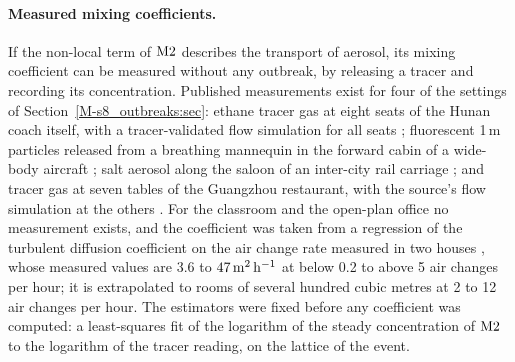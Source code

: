 \paragraph{Measured mixing coefficients.}
If the non-local term of $\mathrm{M2}$ describes the transport of aerosol, its mixing coefficient can be measured
without any outbreak, by releasing a tracer and recording its concentration. Published measurements exist for
four of the settings of Section~\ref{M-s8_outbreaks:sec}: ethane tracer gas at eight seats of the Hunan coach
itself, with a tracer-validated flow simulation for all seats \citep{ou2022}; fluorescent 1\,\textmu m particles
released from a breathing mannequin in the forward cabin of a wide-body aircraft \citep{kinahan2021aerosol};
salt aerosol along the saloon of an inter-city rail carriage \citep{woodward2022evaluation}; and tracer gas at
seven tables of the Guangzhou restaurant, with the source's flow simulation at the others \citep{li2021}. For the classroom and the open-plan office no
measurement exists, and the coefficient was taken from a regression of the turbulent diffusion coefficient on
the air change rate measured in two houses \citep{cheng2011modeling}, whose measured values are 3.6 to
$47\,\mathrm{m}^2\,\mathrm{h}^{-1}$ at below 0.2 to above 5 air changes per hour; it is extrapolated to rooms of several hundred cubic
metres at 2 to 12 air changes per hour. The estimators were fixed
before any coefficient was computed: a least-squares fit of the logarithm of the steady concentration of
$\mathrm{M2}$ to the logarithm of the tracer reading, on the lattice of the event.

